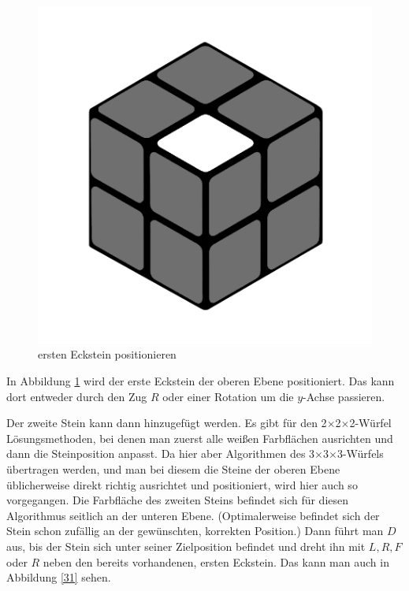 \documentclass[12pt,a4paper, usenames, dvipsnames]{article}
\newcommand{\Ttwo}{2$\times$2$\times$2-}
\newcommand{\Tthree}{3$\times$3$\times$3-}
\begin{document}
\begin{figure}[h]
\includegraphics[scale=0.1]{e1_s1_s2.png}
\caption{ersten Eckstein positionieren}
\label{30}
\end{figure}

In Abbildung \ref{30} wird der erste Eckstein der oberen Ebene positioniert. Das kann dort entweder durch den Zug $R$ oder einer Rotation um die $y$-Achse passieren.

Der zweite Stein kann dann hinzugefügt werden. Es gibt für den \Ttwo Würfel Lösungsmethoden, bei denen man zuerst alle weißen Farbflächen ausrichten und dann die Steinposition anpasst.
Da hier aber Algorithmen des \Tthree Würfels übertragen werden, und man bei diesem die Steine der oberen Ebene üblicherweise direkt richtig ausrichtet und positioniert, wird hier auch so vorgegangen.
Die Farbfläche des zweiten Steins befindet sich für diesen Algorithmus seitlich an der unteren Ebene. (Optimalerweise befindet sich der Stein schon zufällig an der gewünschten, korrekten Position.)
Dann führt man $D$ aus, bis der Stein sich unter seiner Zielposition befindet und dreht ihn mit $L, R, F$ oder $R$ neben den bereits vorhandenen, ersten Eckstein. Das kann man auch in Abbildung \ref{31} sehen.
\end{document}
